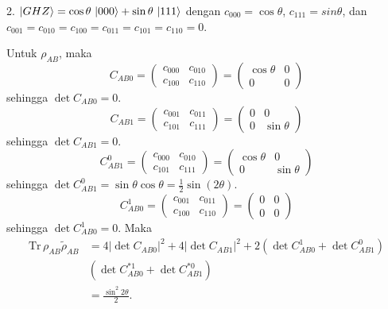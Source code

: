 2. {$\ket{GHZ}=\cos\theta\,\ket{000} + \sin\theta\,\ket{111}$}
dengan $c_{000}=\cos\theta$, $c_{111}=sin\theta$, dan $c_{001}=c_{010}=c_{100}=c_{011}=c_{101}=c_{110}=0$.

Untuk $\rho_{AB}$, maka
\begin{equation}
	C_{AB0}=
	\begin{pmatrix}
		c_{000} & c_{010} \\
		c_{100} & c_{110}
	\end{pmatrix}=
	\begin{pmatrix}
		\cos\theta & 0 \\
		0 & 0
	\end{pmatrix}
\end{equation}
sehingga $\det C_{AB0} = 0$.
\begin{equation}
	C_{AB1}=
	\begin{pmatrix}
		c_{001} & c_{011} \\
		c_{101} & c_{111}
	\end{pmatrix}=
	\begin{pmatrix}
		0 & 0 \\
		0 & \sin\theta
	\end{pmatrix}
\end{equation}
sehingga $\det C_{AB1} = 0$.
\begin{equation}
	C_{AB1}^0=
	\begin{pmatrix}
		c_{000} & c_{010} \\
		c_{101} & c_{111}
	\end{pmatrix}=
	\begin{pmatrix}
		\cos\theta & 0 \\
		0 & \sin\theta
	\end{pmatrix}
\end{equation}
sehingga $\det C_{AB1}^0 = \sin\theta \cos\theta = \frac{1}{2}\sin(2\theta)$.
\begin{equation}
	C_{AB0}^1=
	\begin{pmatrix}
		c_{001} & c_{011} \\
		c_{100} & c_{110}
	\end{pmatrix}=
	\begin{pmatrix}
		0 & 0 \\
		0 & 0
	\end{pmatrix}
\end{equation}
sehingga $\det C_{AB0}^1 = 0$. Maka
\begin{equation}
	\begin{aligned}
		\mathrm{Tr}\,\rho_{AB}\tilde{\rho}_{AB}
		&=4 |\det C_{AB0}|^2+ 4 |\det C_{AB1}|^2+ 2 (\det C_{AB0}^1 + \det C_{AB1}^0)\\
		&(\det C^{*1}_{AB0} + \det C^{*0}_{AB1})\\
		&=\frac{\sin^2 2\theta}{2}.
	\end{aligned}
\end{equation}
